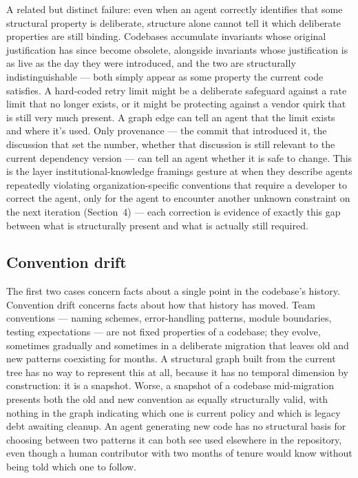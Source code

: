 \documentclass[11pt]{article}
\begin{document}
A related but distinct failure: even when an agent correctly identifies that some structural property is deliberate, structure alone cannot tell it which deliberate properties are still binding. Codebases accumulate invariants whose original justification has since become obsolete, alongside invariants whose justification is as live as the day they were introduced, and the two are structurally indistinguishable --- both simply appear as some property the current code satisfies. A hard-coded retry limit might be a deliberate safeguard against a rate limit that no longer exists, or it might be protecting against a vendor quirk that is still very much present. A graph edge can tell an agent that the limit exists and where it's used. Only provenance --- the commit that introduced it, the discussion that set the number, whether that discussion is still relevant to the current dependency version --- can tell an agent whether it is safe to change. This is the layer institutional-knowledge framings gesture at when they describe agents repeatedly violating organization-specific conventions that require a developer to correct the agent, only for the agent to encounter another unknown constraint on the next iteration (Section~4) --- each correction is evidence of exactly this gap between what is structurally present and what is actually still required.

\subsection{Convention drift}

The first two cases concern facts about a single point in the codebase's history. Convention drift concerns facts about how that history has moved. Team conventions --- naming schemes, error-handling patterns, module boundaries, testing expectations --- are not fixed properties of a codebase; they evolve, sometimes gradually and sometimes in a deliberate migration that leaves old and new patterns coexisting for months. A structural graph built from the current tree has no way to represent this at all, because it has no temporal dimension by construction: it is a snapshot. Worse, a snapshot of a codebase mid-migration presents both the old and new convention as equally structurally valid, with nothing in the graph indicating which one is current policy and which is legacy debt awaiting cleanup. An agent generating new code has no structural basis for choosing between two patterns it can both see used elsewhere in the repository, even though a human contributor with two months of tenure would know without being told which one to follow.
\end{document}
